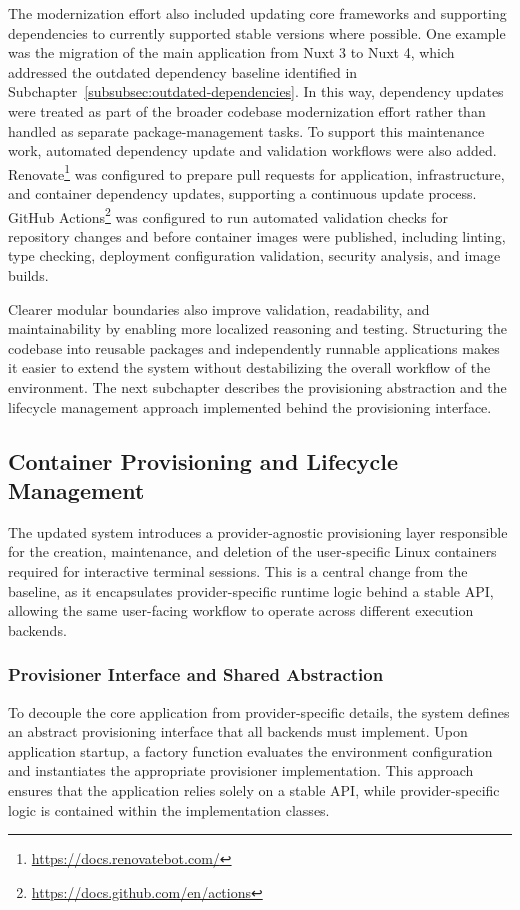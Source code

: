 The modernization effort also included updating core frameworks and supporting dependencies to currently supported stable versions where possible.
One example was the migration of the main application from Nuxt 3 to Nuxt 4, which addressed the outdated dependency baseline identified in Subchapter~\ref{subsubsec:outdated-dependencies}.
In this way, dependency updates were treated as part of the broader codebase modernization effort rather than handled as separate package-management tasks.
To support this maintenance work, automated dependency update and validation workflows were also added.
Renovate\footnote{\url{https://docs.renovatebot.com/}} was configured to prepare pull requests for application, infrastructure, and container dependency updates, supporting a continuous update process.
GitHub Actions\footnote{\url{https://docs.github.com/en/actions}} was configured to run automated validation checks for repository changes and before container images were published, including linting, type checking, deployment configuration validation, security analysis, and image builds.

Clearer modular boundaries also improve validation, readability, and maintainability by enabling more localized reasoning and testing.
Structuring the codebase into reusable packages and independently runnable applications makes it easier to extend the system without destabilizing the overall workflow of the environment.
The next subchapter describes the provisioning abstraction and the lifecycle management approach implemented behind the provisioning interface.

\subsection{Container Provisioning and Lifecycle Management} \label{subsec:container-provisioning-and-lifecycle-management}
The updated system introduces a provider-agnostic provisioning layer responsible for the creation, maintenance, and deletion of the user-specific Linux containers required for interactive terminal sessions.
This is a central change from the baseline, as it encapsulates provider-specific runtime logic behind a stable API, allowing the same user-facing workflow to operate across different execution backends.

\subsubsection{Provisioner Interface and Shared Abstraction} \label{subsubsec:provisioner-interface-and-shared-abstraction}
To decouple the core application from provider-specific details, the system defines an abstract provisioning interface that all backends must implement.
Upon application startup, a factory function evaluates the environment configuration and instantiates the appropriate provisioner implementation.
This approach ensures that the application relies solely on a stable API, while provider-specific logic is contained within the implementation classes.

